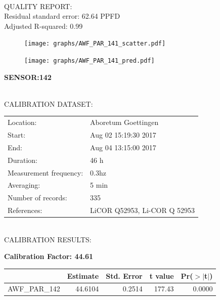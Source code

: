 \documentclass[oneside]{report}
\begin{document}
\hrulefill\\
QUALITY REPORT:\\
Residual standard error: 62.64 PPFD\\
Adjusted R-squared: 0.99



\begin{figure}[H]
  \centering
  \texttt{[image: graphs/AWF\_PAR\_141\_scatter.pdf]}
\end{figure}




\begin{figure}[H]
  \centering
  \texttt{[image: graphs/AWF\_PAR\_141\_pred.pdf]}
\end{figure}

\pagebreak


\begin{center}
\large{\textbf{SENSOR:142}}\\
\end{center}

\hrulefill\\
CALIBRATION DATASET:\\
\begin{table}[h!]
  \centering
  \label{tab:table1}
  \begin{tabular}{ll}
    Location: & Aboretum Goettingen\\ 
    
    
    Start:  & Aug 02 15:19:30 2017 \\
    End:   & Aug 04 13:15:00 2017\\ 
    Duration: & 46 h\\
    Measurement frequency: & 0.3hz\\
    Averaging:  &5 min\\
    Number of records: & 335 \\
    References: & LiCOR Q52953, Li-COR Q 52953 \\
  \end{tabular}
\end{table}

\hrulefill\\
CALIBRATION RESULTS:\\


\begin{center}
\textbf{\large{Calibration Factor: 44.61}}\\
\end{center}
\begin{table}[ht]
\centering
\begin{tabular}{rrrrr}
  \hline
 & Estimate & Std. Error & t value & Pr($>$$|$t$|$) \\ 
  \hline
AWF\_PAR\_142 & 44.6104 & 0.2514 & 177.43 & 0.0000 \\ 
   \hline
\end{tabular}
\end{table}
\end{document}
